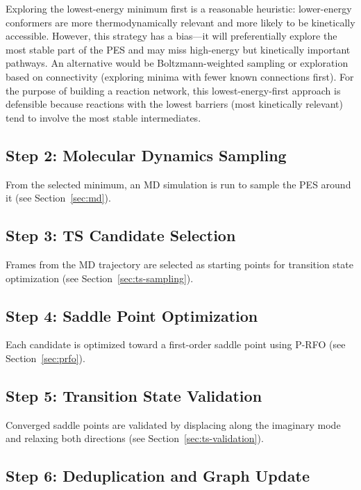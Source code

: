 \documentclass[11pt,a4paper]{article}
\begin{document}
\begin{evaluation}
Exploring the lowest-energy minimum first is a reasonable heuristic: lower-energy conformers are more thermodynamically relevant and more likely to be kinetically accessible. However, this strategy has a bias---it will preferentially explore the most stable part of the PES and may miss high-energy but kinetically important pathways. An alternative would be Boltzmann-weighted sampling or exploration based on connectivity (exploring minima with fewer known connections first). For the purpose of building a reaction network, this lowest-energy-first approach is defensible because reactions with the lowest barriers (most kinetically relevant) tend to involve the most stable intermediates.
\end{evaluation}

\subsection{Step 2: Molecular Dynamics Sampling}

From the selected minimum, an MD simulation is run to sample the PES around it (see Section~\ref{sec:md}).

\subsection{Step 3: TS Candidate Selection}

Frames from the MD trajectory are selected as starting points for transition state optimization (see Section~\ref{sec:ts-sampling}).

\subsection{Step 4: Saddle Point Optimization}

Each candidate is optimized toward a first-order saddle point using P-RFO (see Section~\ref{sec:prfo}).

\subsection{Step 5: Transition State Validation}

Converged saddle points are validated by displacing along the imaginary mode and relaxing both directions (see Section~\ref{sec:ts-validation}).

\subsection{Step 6: Deduplication and Graph Update}
\end{document}
